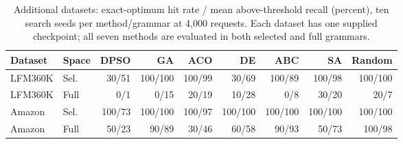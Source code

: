\begin{table}[t]
\centering
\caption{Additional datasets: exact-optimum hit rate / mean above-threshold recall (percent), ten search seeds per method/grammar at 4,000 requests. Each dataset has one supplied checkpoint; all seven methods are evaluated in both selected and full grammars.}
\label{tab:additional-search}
\small
\begin{tabular}{llrrrrrrr}
\toprule
Dataset & Space & DPSO & GA & ACO & DE & ABC & SA & Random \\
\midrule
LFM360K & Sel. & 30/51 & 100/100 & 100/99 & 30/69 & 100/89 & 100/98 & 100/100 \\
LFM360K & Full & 0/1 & 0/15 & 20/19 & 10/28 & 0/8 & 30/20 & 20/7 \\
Amazon & Sel. & 100/73 & 100/100 & 100/97 & 100/100 & 100/100 & 100/100 & 100/100 \\
Amazon & Full & 50/23 & 90/89 & 30/46 & 60/58 & 90/93 & 50/73 & 100/98 \\
\bottomrule
\end{tabular}
\end{table}
